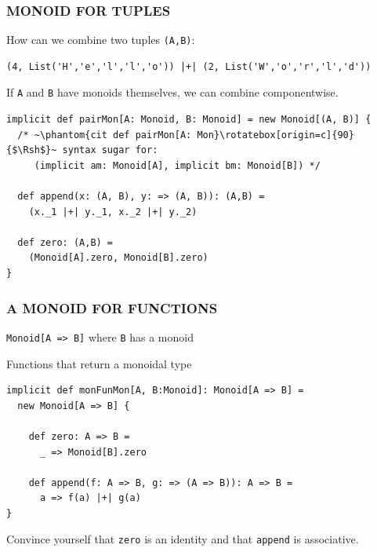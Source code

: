 \documentclass{beamer}
\begin{document}
\begin{frame}[fragile]\frametitle{MONOID FOR TUPLES}
  How can we combine two tuples \texttt{(A,B)}:

  \begin{block}{}
  \begin{lstlisting}
(4, List('H','e','l','l','o')) |+| (2, List('W','o','r','l','d'))
  \end{lstlisting}
  \end{block}

  \pause

  If \texttt{A} and \texttt{B} have monoids themselves, we can \alert{combine componentwise}.

  \begin{block}{}
  \begin{lstlisting}
implicit def pairMon[A: Monoid, B: Monoid] = new Monoid[(A, B)] {
  /* ~\phantom{cit def pairMon[A: Mon}\rotatebox[origin=c]{90}{$\Rsh$}~ syntax sugar for:
     (implicit am: Monoid[A], implicit bm: Monoid[B]) */

  def append(x: (A, B), y: => (A, B)): (A,B) =
    (x._1 |+| y._1, x._2 |+| y._2)

  def zero: (A,B) =
    (Monoid[A].zero, Monoid[B].zero)
}
  \end{lstlisting}
  \end{block}
\end{frame}


\begin{frame}[fragile] \frametitle{A MONOID FOR FUNCTIONS}
  \texttt{Monoid[A => B]} \pause where \alert{\texttt{B} has a monoid}

  \begin{block}{Functions that return a monoidal type}
  \begin{lstlisting}
implicit def monFunMon[A, B:Monoid]: Monoid[A => B] =
  new Monoid[A => B] {

    def zero: A => B =
      _ => Monoid[B].zero

    def append(f: A => B, g: => (A => B)): A => B =
      a => f(a) |+| g(a)
}
  \end{lstlisting}
  \end{block}
  Convince yourself that \texttt{zero} is an identity and that \texttt{append} is associative.
\end{frame}
\end{document}
